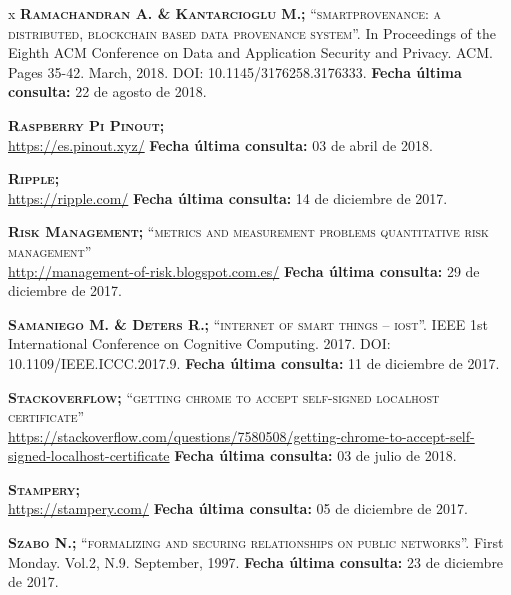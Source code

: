\begin{thebibliography} {x}
	 \textsc{\textbf{Ramachandran A. \& Kantarcioglu M.; }} \textsc{“smartprovenance: a distributed, blockchain based data provenance system”.} In Proceedings of the Eighth ACM Conference on Data and Application Security and Privacy. ACM. Pages 35-42. March, 2018. DOI: 10.1145/3176258.3176333.
	\newline \textbf{Fecha última consulta:} 22 de agosto de 2018.
	
	 \textsc{\textbf{Raspberry Pi Pinout; }} \\ 
	\url{https://es.pinout.xyz/}
	\newline \textbf{Fecha última consulta:} 03 de abril de 2018.
	
	 \textsc{\textbf{Ripple; }} \\
	\url{https://ripple.com/}
	\newline \textbf{Fecha última consulta:} 14 de diciembre de 2017.
	
	 \textsc{\textbf{Risk Management; }}\textsc{“metrics and measurement problems quantitative risk management”} \\
	\url{http://management-of-risk.blogspot.com.es/}
	\newline \textbf{Fecha última consulta:} 29 de diciembre de 2017.
				
	 \textsc{\textbf{Samaniego M. \& Deters R.; }} \textsc{“internet of smart things – iost”.} IEEE 1st International Conference on Cognitive Computing. 2017. DOI: 10.1109/IEEE.ICCC.2017.9.	
	\newline \textbf{Fecha última consulta:} 11 de diciembre de 2017.
	
	 \textsc{\textbf{Stackoverflow; }}\textsc{“getting chrome to accept self-signed localhost certificate”} \\ 
	\url{https://stackoverflow.com/questions/7580508/getting-chrome-to-accept-self-signed-localhost-certificate}
	\newline \textbf{Fecha última consulta:} 03 de julio de 2018.
		
	 \textsc{\textbf{Stampery; }} \\
	\url{https://stampery.com/}
	\newline \textbf{Fecha última consulta:} 05 de diciembre de 2017.
				
	 \textsc{\textbf{Szabo N.; }} \textsc{“formalizing and securing relationships on public networks”.} First Monday. Vol.2, N.9. September, 1997.	
	\newline \textbf{Fecha última consulta:} 23 de diciembre de 2017.
		

\end{thebibliography}
